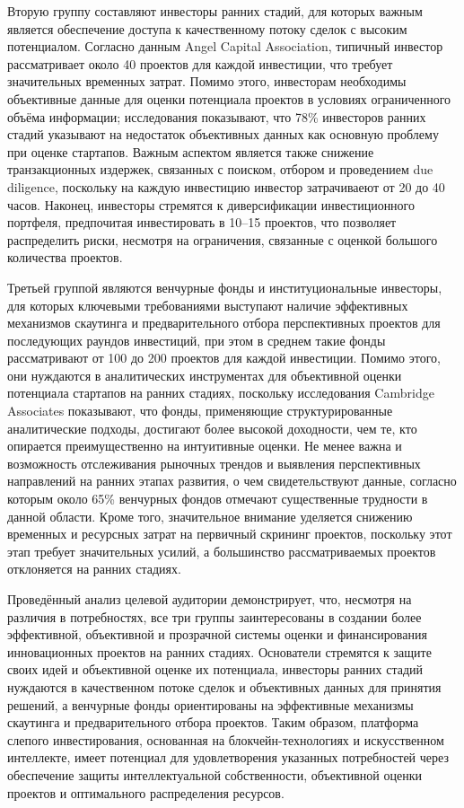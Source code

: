 \documentclass[
    14pt,
    specialist,
    candidate, %
    subf, %
    href,
    dotsinheaders=false
]{disser}
\begin{document}
Вторую группу составляют инвесторы ранних стадий, для которых важным является обеспечение доступа к качественному потоку сделок с высоким потенциалом. Согласно данным Angel Capital Association, типичный инвестор рассматривает около 40 проектов для каждой инвестиции, что требует значительных временных затрат. Помимо этого, инвесторам необходимы объективные данные для оценки потенциала проектов в условиях ограниченного объёма информации; исследования показывают, что 78\% инвесторов ранних стадий указывают на недостаток объективных данных как основную проблему при оценке стартапов. Важным аспектом является также снижение транзакционных издержек, связанных с поиском, отбором и проведением due diligence, поскольку на каждую инвестицию инвестор затрачиваеют от 20 до 40 часов. Наконец, инвесторы стремятся к диверсификации инвестиционного портфеля, предпочитая инвестировать в 10–15 проектов, что позволяет распределить риски, несмотря на ограничения, связанные с оценкой большого количества проектов.

Третьей группой являются венчурные фонды и институциональные инвесторы, для которых ключевыми требованиями выступают наличие эффективных механизмов скаутинга и предварительного отбора перспективных проектов для последующих раундов инвестиций, при этом в среднем такие фонды рассматривают от 100 до 200 проектов для каждой инвестиции. Помимо этого, они нуждаются в аналитических инструментах для объективной оценки потенциала стартапов на ранних стадиях, поскольку исследования Cambridge Associates показывают, что фонды, применяющие структурированные аналитические подходы, достигают более высокой доходности, чем те, кто опирается преимущественно на интуитивные оценки. Не менее важна и возможность отслеживания рыночных трендов и выявления перспективных направлений на ранних этапах развития, о чем свидетельствуют данные, согласно которым около 65\% венчурных фондов отмечают существенные трудности в данной области. Кроме того, значительное внимание уделяется снижению временных и ресурсных затрат на первичный скрининг проектов, поскольку этот этап требует значительных усилий, а большинство рассматриваемых проектов отклоняется на ранних стадиях.

Проведённый анализ целевой аудитории демонстрирует, что, несмотря на различия в потребностях, все три группы заинтересованы в создании более эффективной, объективной и прозрачной системы оценки и финансирования инновационных проектов на ранних стадиях. Основатели стремятся к защите своих идей и объективной оценке их потенциала, инвесторы ранних стадий нуждаются в качественном потоке сделок и объективных данных для принятия решений, а венчурные фонды ориентированы на эффективные механизмы скаутинга и предварительного отбора проектов. Таким образом, платформа слепого инвестирования, основанная на блокчейн-технологиях и искусственном интеллекте, имеет потенциал для удовлетворения указанных потребностей через обеспечение защиты интеллектуальной собственности, объективной оценки проектов и оптимального распределения ресурсов.
\end{document}
